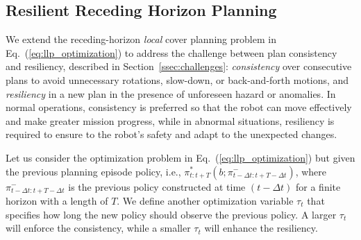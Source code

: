 \documentclass[letterpaper]{article} %
\newcommand{\phdone}[1]{} %
\newcommand{\argmax}{\mathop{\mathrm{argmax}}}
\begin{document}
\subsection{Resilient Receding Horizon Planning} \label{ssec:resilient_rhp}

\phdone{Consistency and Resiliency}
We extend the receding-horizon \textit{local} cover planning problem
in Eq.~(\ref{eq:llp_optimization}) to address the challenge between plan consistency and resiliency, described in Section~\ref{ssec:challenges}:
\textit{consistency} over consecutive plans to avoid unnecessary rotations, slow-down, or back-and-forth motions,
and \textit{resiliency} in a new plan in the presence of unforeseen hazard or anomalies.
In normal operations, consistency is preferred so that the robot can move effectively and make greater mission progress, while in abnormal situations, resiliency is required to ensure to the robot's safety and adapt to the unexpected changes.


\phdone{Receding Horizon Planning Re-formulation}
Let us consider the optimization problem in Eq.~(\ref{eq:llp_optimization}) but given the previous planning episode policy, i.e., 
$\pi_{t:t+T}^*(b; \pi_{t-\Delta t:t+T-\Delta t}^-)$, where $\pi_{t-\Delta t:t+T-\Delta t}^-$ is the previous policy constructed at time $(t - \Delta t)$ for a finite horizon with a length of $T$.
%
%
We define another optimization variable $\tau_t$ that specifies how long the new policy should observe the previous policy.
A larger $\tau_t$ will enforce the consistency, while a smaller $\tau_t$ will enhance the resiliency.
\end{document}
